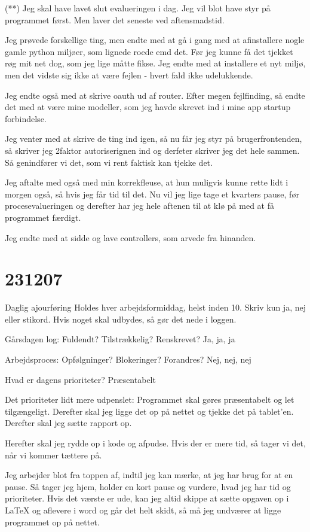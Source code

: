 \documentclass{report}
\begin{document}
(**) Jeg skal have lavet slut evalueringen i dag. Jeg vil blot have styr på programmet først. Men laver det seneste ved aftensmadstid.

Jeg prøvede forskellige ting, men endte med at gå i gang med at afinstallere nogle gamle python miljøer, som lignede roede emd det.
Før jeg kunne få det tjekket røg mit net dog, som jeg lige måtte fikse. Jeg endte med at installere et nyt miljø, men det vidste sig ikke at være fejlen - hvert fald ikke udelukkende.

Jeg endte også med at skrive oauth ud af router.
Efter megen fejlfinding, så endte det med at være mine modeller, som jeg havde skrevet ind i mine app startup forbindelse.

Jeg venter med at skrive de ting ind igen, så nu får jeg styr på brugerfrontenden, så skriver jeg 2faktor autoriserignen ind og derfeter skriver jeg det hele sammen.
Så genindfører vi det, som vi rent faktisk kan tjekke det.

Jeg aftalte med også med min korrekfleuse, at hun muligvis kunne rette lidt i morgen også, så hvis jeg får tid til det.
Nu vil jeg lige tage et kvarters pause, før procesevalueringen og derefter har jeg hele aftenen til at klø på med at få programmet færdigt.

Jeg endte med at sidde og lave controllers, som arvede fra hinanden. 


\section{231207}
Daglig ajourføring
Holdes hver arbejdsformiddag, helst inden 10. Skriv kun ja, nej eller stikord. Hvis noget skal udbydes, så gør det nede i loggen.

Gårsdagen log: Fuldendt? Tilstrækkelig? Renskrevet?
Ja, ja, ja

Arbejdsproces: Opfølgninger? Blokeringer? Forandres?
Nej, nej, nej

Hvad er dagens prioriteter?
Præsentabelt

Det prioriteter lidt mere udpenslet:
Programmet skal gøres præsentabelt og let tilgængeligt.
Derefter skal jeg ligge det op på nettet og tjekke det på tablet'en.
Derefter skal jeg sætte rapport op.

Herefter skal jeg rydde op i kode og afpudse. Hvis der er mere tid, så tager vi det, når vi kommer tættere på.

Jeg arbejder blot fra toppen af, indtil jeg kan mærke, at jeg har brug for at en pause. Så tager jeg hjem, holder en kort pause og vurdere, hvad jeg har tid og prioriteter.
Hvis det værste er ude, kan jeg altid skippe at sætte opgaven op i LaTeX og aflevere i word og går det helt skidt, så må jeg undværer at ligge programmet op på nettet.
\end{document}
